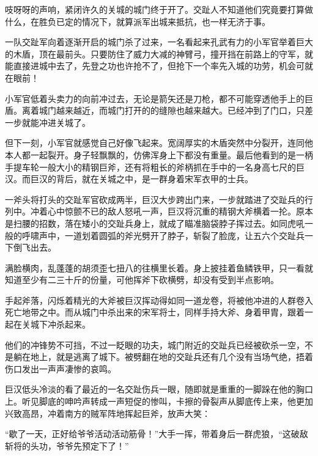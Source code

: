 吱呀呀的声响，紧闭许久的关城的城门终于开了。交趾人不知道他们究竟要打算做什么，在胜负已定的情况下，就算派军出城来抵抗，也一样无济于事。

一队交趾军向着逐渐开启的城门杀了过来，一名看起来孔武有力的小军官举着巨大的木盾，顶在最前头。只要防住了威力大减的神臂弓，撞开挡在前路上的守军，就能直接进城中去了，先登之功也许抢不了，但抢下一个率先入城的功劳，机会可就在眼前！

小军官低着头卖力的向前冲过去，无论是箭矢还是刀枪，都不可能穿透他手上的巨盾。离着城门越来越近，而城门打开的的缝隙也越来越大。已经冲到了门口，只差一步就能冲进关城了。

但下一刻，小军官就感觉自己好像飞起来。宽阔厚实的木盾突然中分裂开，连同他本人都一起裂开。身子轻飘飘的，仿佛浑身上下都没有重量。最后他看到的是一柄手提车轮一般大小的精钢巨斧，还有将粗长的斧柄抓在手中的一名身高七尺的巨汉。而巨汉的背后，就在关城之中，是一群身着宋军衣甲的士兵。

一斧头将打头的交趾军官砍成两半，巨汉大步跨出门来，一步就踏进了交趾兵的行列中。冲着心中惊颤不已的敌人怒吼一声，巨汉将沉重的精钢大斧横着一抡。原本是扫腰的招数，落在矮小的交趾兵身上，就成了瞄准脑袋脖子挥过去。如同虎吼一般的呼啸声中，一道划着圆弧的斧光劈开了脖子，斩裂了脸庞，让五六个交趾兵一下倒飞出去。

满脸横肉，乱蓬蓬的胡须歪七扭八的往横里长着。身上披挂着鱼鳞铁甲，只一看就知道至少有二三十斤的份量，可他挥斧下砍横劈，却没有受到半点影响。

手起斧落，闪烁着精光的大斧被巨汉挥动得如同一道龙卷，将被他冲进的人群卷入死亡地带之中。而从城门中杀出来的宋军将士，同样手持大斧、身着甲胄，跟着一起在关城下冲杀起来。

他们的冲锋势不可挡，不过一眨眼的功夫，城门附近的交趾兵已经被砍杀一空，不是躺在地上，就是逃离了城下。被劈翻在地的交趾兵还有几个没有当场气绝，捂着伤口发出一声声凄惨的哀鸣。

巨汉低头冷淡的看了最近的一名交趾伤兵一眼，随即就是重重的一脚跺在他的胸口上。听见脚底的呻吟声转成一声短促的惨叫，卡擦的骨裂声从脚底传上来，他更加兴致高昂，冲着南方的贼军阵地挥起巨斧，放声大笑：

“歇了一天，正好给爷爷活动活动筋骨！”大手一挥，带着身后一群虎狼，“这破敌斩将的头功，爷爷先预定下了！”

